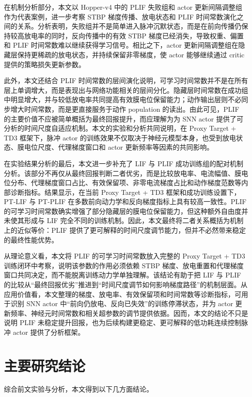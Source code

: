 \documentclass[UTF8,zihao=-4,oneside,openany]{ctexbook}
\begin{document}
在机制分析部分，本文以 Hopper-v4 中的 PLIF 失败组和 actor 更新间隔调整组作为代表案例，进一步考察 STBP 梯度传播、放电状态和 PLIF 时间常数演化之间的关系。分析表明，失败组并不是简单进入脉冲沉默状态，而是在前向传播仍保持较高放电率的同时，反向传播中的有效 STBP 梯度已经消失，导致权重、偏置和 PLIF 时间常数难以继续获得学习信号。相比之下，actor 更新间隔调整组在隐藏层保持更稀疏的放电状态，并持续保留非零梯度，使 actor 能够继续通过 critic 提供的策略损失更新参数。

此外，本文还结合 PLIF 时间常数的层间演化说明，可学习时间常数并不是在所有层上单调增大，而是表现出与网络功能相关的层间分化。隐藏层时间常数在成功组中明显增大，并与较低放电率共同提高有效膜电位保留能力；动作输出层则不必同步增大时间常数，而是更直接服务于动作 population 的读出。由此可见，PLIF 的主要价值不应被简单概括为最终回报提升，而应理解为为 SNN actor 提供了可分析的时间尺度自适应机制。本文的实验和分析共同说明，在 Proxy Target + TD3 框架下，脉冲 actor 的训练效果不仅取决于神经元模型本身，也受到放电状态、膜电位尺度、代理梯度窗口和 actor 更新频率等因素的共同影响。

在实验结果分析的最后，本文进一步补充了 LIF 与 PLIF 成功训练组的配对机制分析。该部分不再仅从最终回报判断二者优劣，而是比较放电率、电流幅值、膜电位分布、代理梯度窗口占比、有效保留项、非零电流梯度占比和动作梯度范数等内部诊断指标。结果显示，在当前 Proxy Target + TD3 框架和成功训练设置下，PT-LIF 与 PT-PLIF 在多数前向动力学和反向梯度指标上具有较高一致性。PLIF 的可学习时间常数确实增强了部分隐藏层的膜电位保留能力，但这种额外自由度并未使其形成与 LIF 完全不同的训练机制。因此，本文最终将二者关系概括为机制上的近似等价：PLIF 提供了更可解释的时间尺度调节能力，但并不必然带来稳定的最终性能优势。

从理论意义看，本文将 PLIF 的可学习时间常数放入完整的 Proxy Target + TD3 训练闭环中考察，说明该参数的作用必须依赖 STBP 梯度、放电重置和代理梯度窗口共同决定，而不能脱离训练动力学单独理解。该结论有助于把 LIF 与 PLIF 的比较从“最终回报优劣”推进到“时间尺度调节如何影响梯度路径”的机制层面。从应用价值看，本文整理的梯度、放电率、有效保留项和时间常数等诊断指标，可用于识别 SNN actor 中“前向仍放电、反向已失效”的训练停滞状态，并为 actor 更新频率、神经元时间常数和相关超参数的调节提供依据。因而，本文的结论不只是说明 PLIF 未稳定提升回报，也为后续构建更稳定、更可解释的低功耗连续控制脉冲 actor 提供了分析框架。

\section{主要研究结论}
综合前文实验与分析，本文得到以下几方面结论。
\end{document}
